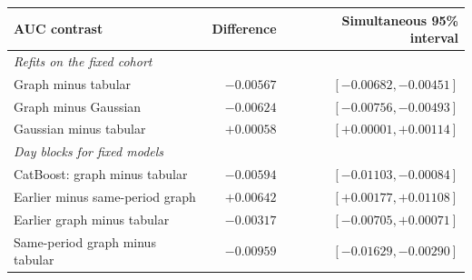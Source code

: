 \begin{tabular}{lrr}
\toprule
AUC contrast & Difference & Simultaneous 95\% interval \\
\midrule
\multicolumn{3}{l}{\emph{Refits on the fixed cohort}} \\
Graph minus tabular & $-0.00567$ & $[-0.00682, -0.00451]$ \\
Graph minus Gaussian & $-0.00624$ & $[-0.00756, -0.00493]$ \\
Gaussian minus tabular & $+0.00058$ & $[+0.00001, +0.00114]$ \\
\multicolumn{3}{l}{\emph{Day blocks for fixed models}} \\
CatBoost: graph minus tabular & $-0.00594$ & $[-0.01103, -0.00084]$ \\
Earlier minus same-period graph & $+0.00642$ & $[+0.00177, +0.01108]$ \\
Earlier graph minus tabular & $-0.00317$ & $[-0.00705, +0.00071]$ \\
Same-period graph minus tabular & $-0.00959$ & $[-0.01629, -0.00290]$ \\
\bottomrule
\end{tabular}
